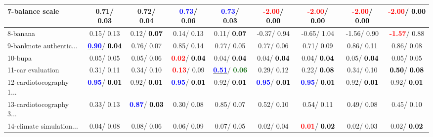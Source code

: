\begin{table}[h]
\begin{center}
\begin{tabular}{lc|c|c|c|c|c|c|c}
7-balance scale &   0.71/  0.03 &   0.72/  0.04 & \textcolor{blue}{\textbf{  0.73}}/  0.06 & \textcolor{blue}{\textbf{  0.73}}/  0.03 & \textcolor{red}{\textbf{ -2.00}}/\textcolor{black}{\textbf{  0.00}} & \textcolor{red}{\textbf{ -2.00}}/\textcolor{black}{\textbf{  0.00}} & \textcolor{red}{\textbf{ -2.00}}/\textcolor{black}{\textbf{  0.00}} & \textcolor{red}{\textbf{ -2.00}}/\textcolor{black}{\textbf{  0.00}} \\ \hline
8-banana &   0.15/  0.13 &   0.12/\textcolor{black}{\textbf{  0.07}} &   0.14/  0.13 &   0.11/\textcolor{black}{\textbf{  0.07}} &  -0.37/  0.94 &  -0.65/  1.04 &  -1.56/  0.90 & \textcolor{red}{\textbf{ -1.57}}/  0.88 \\
9-banknote authentic... & \underline{\textcolor{blue}{\textbf{  0.90}}}/\textcolor{black}{\textbf{  0.04}} &   0.76/  0.07 &   0.85/  0.14 &   0.77/  0.05 &   0.77/  0.06 &   0.71/  0.09 &   0.86/  0.11 &   0.86/  0.08 \\
10-bupa &   0.05/  0.05 &   0.05/  0.06 & \textcolor{red}{\textbf{  0.02}}/\textcolor{black}{\textbf{  0.04}} &   0.04/\textcolor{black}{\textbf{  0.04}} &   0.04/\textcolor{black}{\textbf{  0.04}} &   0.04/\textcolor{black}{\textbf{  0.04}} &   0.05/\textcolor{black}{\textbf{  0.04}} &   0.05/  0.05 \\
11-car evaluation &   0.31/  0.11 &   0.34/  0.10 & \textcolor{red}{\textbf{  0.13}}/  0.09 & \underline{\textcolor{blue}{\textbf{  0.51}}}/\textcolor{darkgreen}{\textbf{  0.06}} &   0.29/  0.12 &   0.22/\textcolor{black}{\textbf{  0.08}} &   0.34/  0.10 & \textcolor{black}{\textbf{  0.50}}/\textcolor{black}{\textbf{  0.08}} \\
12-cardiotocography 1... & \textcolor{blue}{\textbf{  0.95}}/\textcolor{black}{\textbf{  0.01}} &   0.92/\textcolor{black}{\textbf{  0.01}} & \textcolor{blue}{\textbf{  0.95}}/\textcolor{black}{\textbf{  0.01}} &   0.92/\textcolor{black}{\textbf{  0.01}} & \textcolor{blue}{\textbf{  0.95}}/\textcolor{black}{\textbf{  0.01}} & \textcolor{blue}{\textbf{  0.95}}/\textcolor{black}{\textbf{  0.01}} &   0.92/\textcolor{black}{\textbf{  0.01}} &   0.92/\textcolor{black}{\textbf{  0.01}} \\
13-cardiotocography 3... &   0.33/  0.13 & \textcolor{blue}{\textbf{  0.87}}/\textcolor{black}{\textbf{  0.03}} &   0.30/  0.08 &   0.85/  0.07 &   0.52/  0.10 &   0.54/  0.11 &   0.49/  0.08 &   0.45/  0.10 \\
14-climate simulation... &   0.04/  0.08 &   0.08/  0.06 &   0.06/  0.09 &   0.07/  0.05 &   0.02/  0.04 & \textcolor{red}{\textbf{  0.01}}/\textcolor{black}{\textbf{  0.02}} &   0.02/  0.03 &   0.02/\textcolor{black}{\textbf{  0.02}} \\ \hline

\end{tabular}
\end{center}
\end{table}
